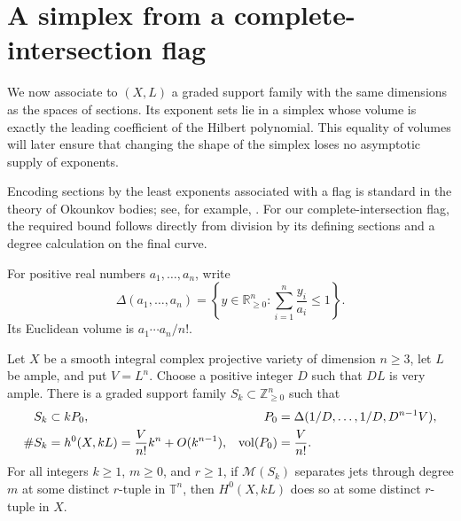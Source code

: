 \section{A simplex from a complete-intersection flag}
\label{sec:flag}

We now associate to $(X,L)$ a graded support family with the same dimensions as the spaces of sections. Its exponent sets lie in a simplex whose volume is exactly the leading coefficient of the Hilbert polynomial. This equality of volumes will later ensure that changing the shape of the simplex loses no asymptotic supply of exponents.

Encoding sections by the least exponents associated with a flag is standard in the theory of Okounkov bodies; see, for example, \textcite[Lemma~1.3]{LM09}. For our complete-intersection flag, the required bound follows directly from division by its defining sections and a degree calculation on the final curve.

For positive real numbers $a_1,\ldots,a_n$, write
\begin{equation}\label{eq:simplex-definition}
 \Delta(a_1,\ldots,a_n)
 =\left\{y\in\mathbb{R}_{\geq0}^n:
              \sum_{i=1}^n\frac{y_i}{a_i}\leq1\right\}.
\end{equation}
Its Euclidean volume is $a_1\cdots a_n/n!$.

\begin{proposition}\label{prop:flag-simplex}
Let $X$ be a smooth integral complex projective variety of dimension $n\geq3$, let $L$ be ample, and put $V=L^n$. Choose a positive integer $D$ such that $DL$ is very ample. There is a graded support family $S_k\subset\mathbb{Z}_{\geq0}^n$ such that
\begin{align}
 S_k&\subset kP_0,
 &P_0&=\Delta(1/D,\ldots,1/D,D^{n-1}V),
 \label{eq:flag-simplex}\\
 \#S_k&=h^0(X,kL)
       =\frac{V}{n!}k^n+O(k^{n-1}),
 &\operatorname{vol}(P_0)&=\frac{V}{n!}.
 \label{eq:flag-count}
\end{align}
For all integers $k\geq1$, $m\geq0$, and $r\geq1$, if $\mathcal{M}(S_k)$ separates jets through degree $m$ at some distinct $r$-tuple in $\mathbb{T}^n$, then $H^0(X,kL)$ does so at some distinct $r$-tuple in $X$.
\end{proposition}

